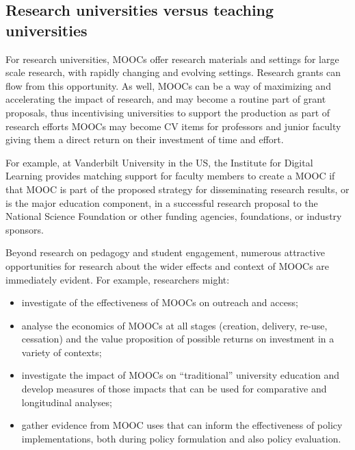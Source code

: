 \subsection{Research universities versus teaching universities}

For research universities, MOOCs offer research materials and settings
for large scale research, with rapidly changing and evolving
settings. Research grants can flow from this opportunity.
As well, MOOCs can be a way of maximizing and accelerating the impact of
research, and may become a routine part of grant proposals, thus
incentivising universities to support the production as part of research
efforts MOOCs may become CV items for professors and junior faculty
giving them a direct return on their investment of time and effort.

For example, at Vanderbilt University in the US, the Institute for
Digital Learning provides matching support for faculty members to create a
MOOC if that MOOC is part of the proposed strategy for disseminating
research results, or is the major education component, in a successful research
proposal to the National
Science Foundation or other funding agencies, foundations, or industry sponsors.

Beyond research on pedagogy and student engagement, numerous attractive
opportunities for research about the wider effects and context of MOOCs
are immediately evident.  For example, researchers might:

\begin{itemize}

\item investigate of the effectiveness of MOOCs on outreach and access;

\item analyse the economics of MOOCs at all stages (creation, delivery,
re-use, cessation) and the value proposition of possible returns on
investment in a variety of contexts;  

\item investigate the impact of MOOCs on
``traditional'' university education and develop measures of those impacts
that can be used for comparative and longitudinal analyses;

\item gather evidence from MOOC uses that can inform the effectiveness of policy implementations,
  both during policy formulation and also policy evaluation.

\end{itemize}

